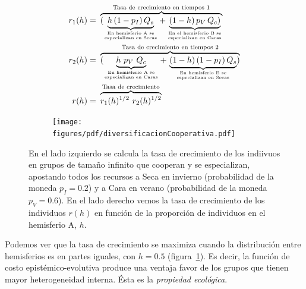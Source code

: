 \documentclass[a4paper,11pt]{book}
\newcommand\hfrac[2]{\genfrac{}{}{0pt}{}{#1}{#2}} %
\theoremstyle{definition}
\begin{document}
\begin{figure}[ht!]
\vspace{0cm}
\centering
 \begin{subfigure}[c]{0.44\textwidth}
 \begin{align*}
 r_{1}(h) = & \  \overbrace{(\underbrace{h \, (1-p_I) \, Q_s}_{\hfrac{\text{En hemisferio A se}}{\text{especializan en Secas}}} + \underbrace{(1-h) \, p_V \, Q_c )}_{\hfrac{\text{En el hemisferio B se}}{\text{especializan en Caras}}} }^{\text{Tasa de crecimiento en tiempos 1}} \\
 r_{2}(h) = & \ \overbrace{ (\underbrace{h \ p_V \ Q_c}_{\hfrac{\text{En  hemisferio A se}}{\text{especializan en Caras}}} + \, \underbrace{(1-h) \, (1-p_I) \, Q_s}_{\hfrac{\text{En  hemisferio B se}}{\text{especializan en Secas}}} )}^{\text{Tasa de crecimiento en tiempos 2}} \\
 r(h) = & \ \overbrace{r_{1}(h)^{1/2} \ r_2(h)^{1/2}}^{\text{Tasa de crecimiento}}
\end{align*}
 \end{subfigure}
 \hspace{0.2cm}
  \begin{subfigure}[c]{0.44\textwidth}
\begin{flushright}
 \texttt{[image: figures/pdf/diversificacionCooperativa.pdf]}
 \end{flushright}
 \end{subfigure}
 \caption{
 En el lado izquierdo se calcula la tasa de crecimiento de los indiivuos en grupos de tama\~no infinito que cooperan y se especializan, apostando todos los recursos a Seca en invierno (probabilidad de la moneda $p_I = 0.2$) y a Cara en verano (probabilidad de la moneda $p_V = 0.6$).
 En el lado derecho vemos la tasa de crecimiento de los individuos $r(h)$ en funci\'on de la proporci\'on de individuos en el hemisferio A, $h$.
 }
 \label{fig:divCoop}
 \vspace{-0.1cm}
 \end{figure}
%
Podemos ver que la tasa de crecimiento se maximiza cuando la distribuci\'on entre hemisferios es en partes iguales, con $h=0.5$ (figura~\ref{fig:divCoop}).
%
Es decir, la funci\'on de costo epist\'emico-evolutiva produce una ventaja favor de los grupos que tienen mayor heterogeneidad interna.
%
\'Esta es la \emph{propiedad ecol\'ogica}.
\end{document}
